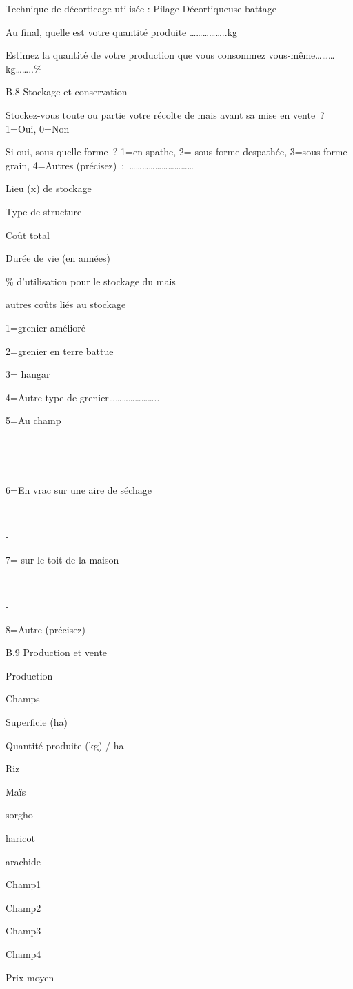 \documentclass[12pt,oneside]{report}
\begin{document}
Technique de décorticage utilisée : Pilage Décortiqueuse battage

Au final, quelle est votre quantité produite ……………..kg

Estimez la quantité de votre production que vous consommez vous-même………kg……..\%

B.8 Stockage et conservation

Stockez-vous toute ou partie votre récolte de mais avant sa mise en vente ?  1=Oui, 0=Non

Si oui, sous quelle forme ? 1=en spathe, 2= sous forme despathée, 3=sous forme grain, 4=Autres (précisez) : …………………………

Lieu (x) de stockage

Type de structure

Coût total

Durée de vie (en années)

\% d’utilisation pour le stockage du mais

autres coûts liés au stockage

1=grenier amélioré

2=grenier en terre battue

3= hangar

4=Autre type de grenier…………………..

5=Au champ

-

-

6=En vrac sur une aire de séchage

-

-

7= sur le toit de la maison

-

-

8=Autre (précisez)

B.9 Production et vente

Production

Champs

Superficie  (ha)

Quantité produite (kg) / ha

Riz

Maïs

sorgho

haricot

arachide

Champ1

Champ2

Champ3

Champ4

Prix moyen
\end{document}
